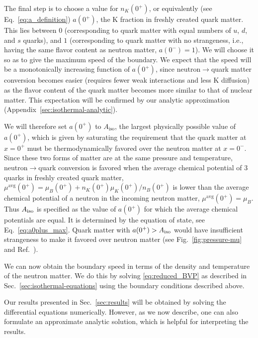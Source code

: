 \documentclass[10pt,superscriptaddress,
amsmath,aps,prc,twocolumn,nofootinbib,floatfix]{revtex4-1}
\newcommand{\mga}[1]{{\color[rgb]{0.6,0,0}#1}}
\begin{document}
\mga{
The final step is to choose a value for $n_K(0^+)$, or equivalently (see Eq.~\ref{eq:a_definition})
$a(0^+)$, the K fraction in freshly created quark matter. This lies between 0 (corresponding to quark matter with equal numbers of $u$, $d$, and $s$ quarks), and $1$ (corresponding to quark matter with no strangeness, i.e., having the same flavor content as neutron matter, $a(0^-)=1$).  We will  choose it so as to give the maximum speed of the boundary. We expect that the speed will be a monotonically increasing function of $a(0^+)$, since
neutron$\to$quark matter conversion becomes easier (requires fewer weak interactions and less K diffusion) as the flavor content of the quark matter becomes more similar to that of nuclear matter. This expectation will be confirmed by our analytic approximation (Appendix~\ref{sec:isothermal-analytic}).
 
We will therefore set $a(0^+)$ to $A_{\text{iso}}$, the largest physically possible value of $a(0^+)$, which is given by saturating the requirement that the quark matter at $x=0^+$ must be thermodynamically favored over the neutron matter at $x=0^-$. Since these two forms of matter are at the same pressure and temperature, neutron$\to$quark conversion is favored when
the average chemical potential of 3 quarks in freshly created quark matter,
$\mu^\text{avg}(0^+)=\mu_B(0^+) + n_K(0^+)\mu_K(0^+)/n_B(0^+)$
is lower than the average chemical potential of a neutron in the
incoming neutron matter, $\mu^\text{avg}(0^+)=\mu_B$. Thus $A_{\rm iso}$ is specified as the value of $a(0^+)$ for which the average chemical potentials are equal. It is determined by the equation of state, see Eq.~\eqref{eq:a0plus_max}.
Quark matter with $a(0^+)>A_{\rm iso}$ would have insufficient strangeness to make it favored over neutron matter (see Fig.~\ref{fig:pressure-mu} and Ref.~\cite{Alford:2014jha}).
}

We can now obtain the boundary speed in terms of the density and temperature of the neutron matter.
We do this by solving \eqref{eq:reduced_BVP} as described in Sec.~\ref{sec:isothermal-equations} using the boundary conditions described above.

Our results presented in Sec.~\ref{sec:results} will be obtained by solving the differential equations numerically.
However, as we now describe, one can also formulate an approximate analytic solution, which is helpful for interpreting the results.
\end{document}
